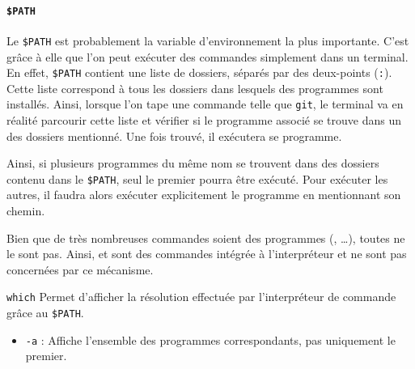 \paragraph{\texttt{\$PATH}}
Le \texttt{\$PATH} est probablement la variable d'environnement la plus importante. C'est grâce à elle que l'on peut exécuter des commandes simplement dans un terminal.
En effet, \texttt{\$PATH} contient une liste de dossiers, séparés par des deux-points (\texttt{:}). Cette liste correspond à tous les dossiers dans lesquels des programmes sont installés. Ainsi, lorsque l'on tape une commande telle que \texttt{git}, le terminal va en réalité parcourir cette liste et vérifier si le programme associé se trouve dans un des dossiers mentionné. Une fois trouvé, il exécutera se programme.

Ainsi, si plusieurs programmes du même nom se trouvent dans des dossiers contenu dans le \texttt{\$PATH}, seul le premier pourra être exécuté. Pour exécuter les autres, il faudra alors exécuter explicitement le programme en mentionnant son chemin.

 Bien que de très nombreuses commandes soient des programmes (, \dots), toutes ne le sont pas. Ainsi,  et  sont des commandes intégrée à l'interpréteur et ne sont pas concernées par ce mécanisme.

\texttt{which} 
Permet d'afficher la résolution effectuée par l'interpréteur de commande grâce au \texttt{\$PATH}.
\begin{itemize}
    \item \texttt{-a} : Affiche l'ensemble des programmes correspondants, pas uniquement le premier.
\end{itemize}

